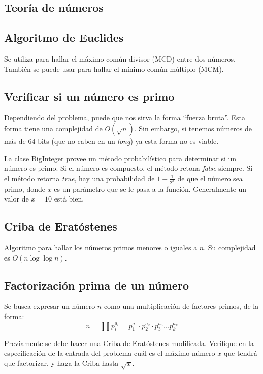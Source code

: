 \documentclass{article}
\begin{document}
\begin{multicols}{2}
\section{Teoría de números}
	\subsection{Algoritmo de Euclides}
	Se utiliza para hallar el máximo común divisor (MCD) entre dos números. También se puede usar para hallar el mínimo común múltiplo (MCM).
	

	\subsection{Verificar si un número es primo}
	Dependiendo del problema, puede que nos sirva la forma ``fuerza bruta''. Esta forma tiene una complejidad de \( O(\sqrt{n}) \). Sin embargo, si tenemos números de más de 64 bits (que no caben en un \emph{long}) ya esta forma no es viable. 
	
	La clase BigInteger provee un método probabilístico para determinar si un número es primo. Si el número es compuesto, el método retona \emph{false} siempre. Si el método retorna \emph{true}, hay una probabilidad de \( 1-\frac{1}{2^x} \) de que el número sea primo, donde \(x\) es un parámetro que se le pasa a la función. Generalmente un valor de \(x = 10\) está bien.
	

	\subsection{Criba  de Eratóstenes}
	Algoritmo para hallar los números primos menores o iguales a \( n \). Su complejidad es \( O(n \log \log n) \).
	
	
	\subsection{Factorización prima de un número}
	Se busca expresar un número \( n \) como una multiplicación de factores primos, de la forma:
	\[ n = \prod p_{i}^{a_{i}} = p_{1}^{a_{1}} \cdot p_{2}^{a_{2}} \cdot p_{3}^{a_{3}} ...  p_{k}^{a_{k}} \]
	
	Previamente se debe hacer una Criba de Eratóstenes modificada. Verifique en la especificación de la entrada del problema cuál es el máximo número \( x \) que tendrá que factorizar, y haga la Criba hasta \( \sqrt{x} \).
	

\end{multicols}
\end{document}
